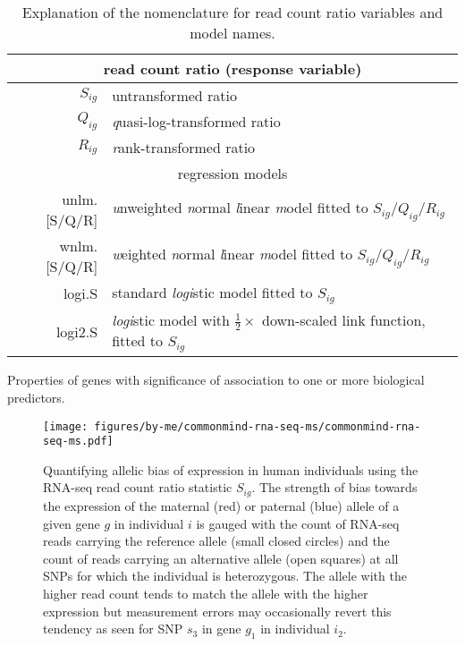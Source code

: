 \documentclass[12pt,letterpaper]{article}
\begin{document}
\begin{table}
\begin{tabular}{r|l}
\multicolumn{2}{c}{read count ratio (response variable)} \\
\hline
\(S_{ig}\) & untransformed ratio \\
\(Q_{ig}\) & \emph{q}uasi-log-transformed ratio \\
\(R_{ig}\) & \emph{r}ank-transformed ratio \\
\hline
\multicolumn{2}{c}{regression models} \\
\hline
unlm.[S/Q/R] & \emph{u}nweighted \emph{n}ormal \emph{l}inear \emph{m}odel fitted to \(S_{ig}\)/\(Q_{ig}\)/\(R_{ig}\)\\
wnlm.[S/Q/R] & \emph{w}eighted \emph{n}ormal \emph{l}inear \emph{m}odel fitted to \(S_{ig}\)/\(Q_{ig}\)/\(R_{ig}\)\\
logi.S & standard \emph{logi}stic model fitted to \(S_{ig}\)\\
logi2.S & \emph{logi}stic model with \(\frac{1}{2}\times\) down-scaled link function, fitted to \(S_{ig}\) \\
\end{tabular}
\caption{Explanation of the nomenclature for read count ratio variables and
model names.}
\label{tab:model-names}
\end{table}

\begin{table}[h]
\footnotesize

\caption{
Properties of genes with significance of association to one or more biological predictors.
}
\label{tab:signif-gene-effects}
\end{table}

\begin{figure}[h]
\begin{center}
\texttt{[image: figures/by-me/commonmind-rna-seq-ms/commonmind-rna-seq-ms.pdf]}
\end{center}
\caption{ Quantifying allelic bias of expression in human
individuals using the RNA-seq read count ratio statistic \(S_{ig}\).  The strength of
bias towards the expression of the maternal (red) or paternal (blue) allele of
a given gene \(g\) in individual \(i\) is gauged with the count of RNA-seq
reads carrying the reference allele (small closed circles) and the count of
reads carrying an alternative allele (open squares) at all SNPs for which the
individual is heterozygous.  The allele with the higher read count tends to
match the allele with the higher expression but measurement errors may
occasionally revert this tendency as seen for SNP \(s_3\) in gene \(g_1\) in
individual \(i_2\).
}
\label{fig:study-design}
\end{figure}
\end{document}
